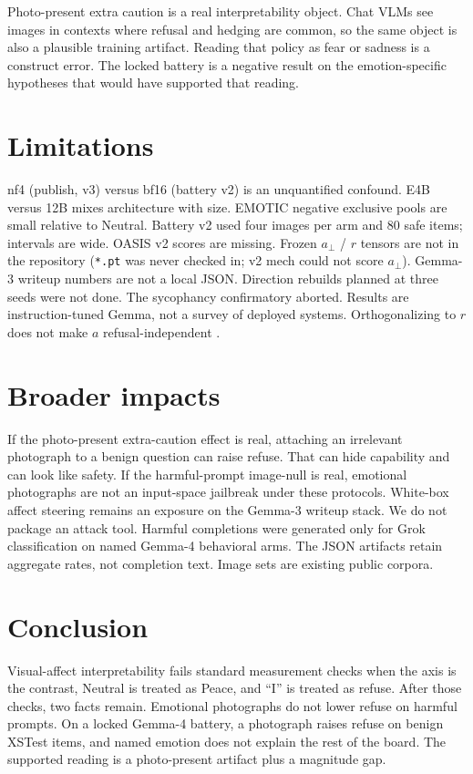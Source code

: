 \documentclass{article}
\begin{document}
Photo-present extra caution is a real interpretability object. Chat VLMs see images in contexts where refusal and hedging are common, so the same object is also a plausible training artifact. Reading that policy as fear or sadness is a construct error. The locked battery is a negative result on the emotion-specific hypotheses that would have supported that reading.

\section{Limitations}
\label{sec:limitations}

nf4 (publish, v3) versus bf16 (battery v2) is an unquantified confound. E4B versus 12B mixes architecture with size. EMOTIC negative exclusive pools are small relative to Neutral. Battery v2 used four images per arm and $80$ safe items; intervals are wide. OASIS v2 scores are missing. Frozen $a_\perp$ / $r$ tensors are not in the repository (\texttt{*.pt} was never checked in; v2 mech could not score $a_\perp$). Gemma-3 writeup numbers are not a local JSON. Direction rebuilds planned at three seeds were not done. The sycophancy confirmatory aborted. Results are instruction-tuned Gemma, not a survey of deployed systems. Orthogonalizing to $r$ does not make $a$ refusal-independent \citep{wollschlager2025geometry}.

\section{Broader impacts}
\label{sec:impacts}

If the photo-present extra-caution effect is real, attaching an irrelevant photograph to a benign question can raise refuse. That can hide capability and can look like safety. If the harmful-prompt image-null is real, emotional photographs are not an input-space jailbreak under these protocols. White-box affect steering remains an exposure on the Gemma-3 writeup stack. We do not package an attack tool. Harmful completions were generated only for Grok classification on named Gemma-4 behavioral arms. The JSON artifacts retain aggregate rates, not completion text. Image sets are existing public corpora.

\section{Conclusion}
\label{sec:conclusion}

Visual-affect interpretability fails standard measurement checks when the axis is the contrast, Neutral is treated as Peace, and ``I'' is treated as refuse. After those checks, two facts remain. Emotional photographs do not lower refuse on harmful prompts. On a locked Gemma-4 battery, a photograph raises refuse on benign XSTest items, and named emotion does not explain the rest of the board. The supported reading is a photo-present artifact plus a magnitude gap.
\end{document}
